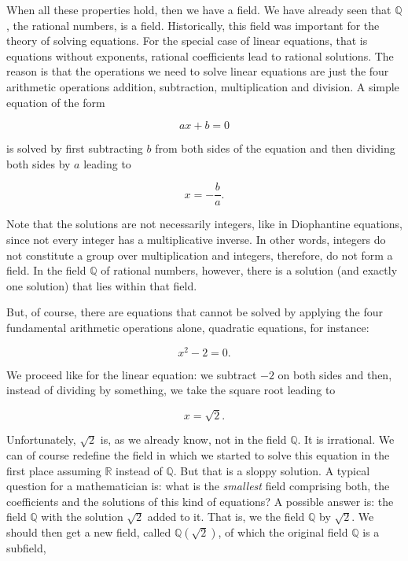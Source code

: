 \documentclass[tikz]{scrreprt}
\begin{document}
When all these properties hold, then we have a field.
We have already seen that $\mathbb{Q}$, the rational numbers,
is a field. Historically, this field was important for
the theory of solving equations. For the special case of
linear equations, that is equations without exponents,
rational coefficients lead to rational solutions. The reason is
that the operations we need to solve linear equations are
just the four arithmetic operations addition, subtraction,
multiplication and division. A simple equation of the form

\begin{equation}
ax + b = 0
\end{equation}

is solved by first subtracting $b$ from both sides of the equation
and then dividing both sides by $a$ leading to

\begin{equation}
x = -\frac{b}{a}.
\end{equation}

Note that the solutions are not necessarily integers,
like in Diophantine equations, since not every integer
has a multiplicative inverse. In other words, integers
do not constitute a group over multiplication and integers,
therefore, do not form a field.
In the field $\mathbb{Q}$ of rational numbers, however,
there is a solution (and exactly one solution) that lies
within that field.

But, of course, there are equations that cannot be solved
by applying the four fundamental arithmetic operations alone,
quadratic equations, for instance:

\begin{equation}
x^2 - 2 = 0.
\end{equation}

We proceed like for the linear equation: we subtract
$-2$ on both sides and then, instead of dividing by something,
we take the square root leading to

\begin{equation}
x = \sqrt{2}.
\end{equation}

Unfortunately, $\sqrt{2}$ is, as we already know,
not in the field $\mathbb{Q}$. It is irrational.
We can of course redefine the field 
in which we started to solve this equation in the first place
assuming $\mathbb{R}$ instead of $\mathbb{Q}$.
But that is a sloppy solution.
A typical question for a mathematician is:
what is the \emph{smallest} field comprising both,
the coefficients and the solutions of this kind of equations?
A possible answer is: the field $\mathbb{Q}$ with the solution
$\sqrt{2}$ added to it. 
That is, we  the field $\mathbb{Q}$
by  $\sqrt{2}$.
We should then get a new field, called $\mathbb{Q}(\sqrt{2})$,
of which the original field $\mathbb{Q}$ is a subfield,
\ie\
\end{document}
